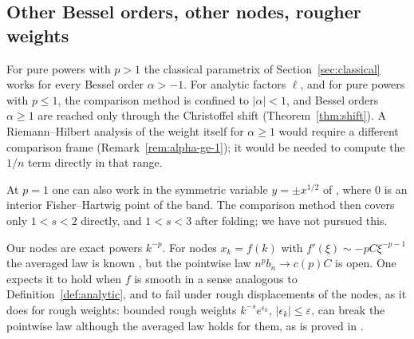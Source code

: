 \subsection{Other Bessel orders, other nodes, rougher weights}\label{sec:nodes}
For pure powers with $p>1$ the classical parametrix of Section~\ref{sec:classical} works for every Bessel order
$\alpha>-1$. For analytic factors $\ell$, and for pure powers with $p\le1$, the comparison method is confined to
$|\alpha|<1$, and Bessel orders $\alpha\ge1$ are reached only through the Christoffel shift
(Theorem~\ref{thm:shift}). A Riemann--Hilbert analysis of the weight itself for $\alpha\ge1$ would require a different
comparison frame (Remark~\ref{rem:alpha-ge-1}); it would be needed to compute the $1/n$ term directly in that range.

At $p=1$ one can also work in the symmetric variable $y=\pm x^{1/2}$ of \cite{WLXZ}, where $0$ is an interior
Fisher--Hartwig point of the band. The comparison method then covers only $1<s<2$ directly, and $1<s<3$ after folding;
we have not pursued this.

Our nodes are exact powers $k^{-p}$. For nodes $x_k=f(k)$ with $f'(\xi)\sim-pC\xi^{-p-1}$ the averaged law is known
\cite[Corollary~1.2]{Paper1}, but the pointwise law $n^pb_n\to c(p)C$ is open. One expects it to hold when $f$ is smooth
in a sense analogous to Definition~\ref{def:analytic}, and to fail under rough displacements of the nodes, as it does
for rough weights: bounded rough weights $k^{-s}e^{\epsilon_k}$, $|\epsilon_k|\le\varepsilon$, can break the pointwise
law although the averaged law holds for them, as is proved in \cite{Paper3}.

